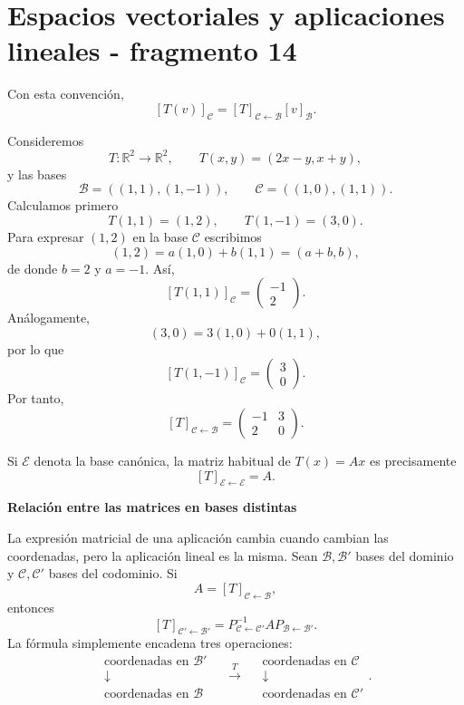 \section{Espacios vectoriales y aplicaciones lineales - fragmento 14}
Con esta convención,
\[
\boxed{
[T(v)]_{\mathcal C}
=
[T]_{\mathcal C\leftarrow\mathcal B}
[v]_{\mathcal B}.
}
\]

\begin{example}
Consideremos
\[
T:\mathbb{R}^2\longrightarrow\mathbb{R}^2,
\qquad
T(x,y)=(2x-y,x+y),
\]
y las bases
\[
\mathcal B=((1,1),(1,-1)),
\qquad
\mathcal C=((1,0),(1,1)).
\]
Calculamos primero
\[
T(1,1)=(1,2),
\qquad
T(1,-1)=(3,0).
\]
Para expresar $(1,2)$ en la base $\mathcal C$ escribimos
\[
(1,2)=a(1,0)+b(1,1)=(a+b,b),
\]
de donde $b=2$ y $a=-1$. Así,
\[
[T(1,1)]_{\mathcal C}
=\begin{pmatrix}-1\\2\end{pmatrix}.
\]
Análogamente,
\[
(3,0)=3(1,0)+0(1,1),
\]
por lo que
\[
[T(1,-1)]_{\mathcal C}
=\begin{pmatrix}3\\0\end{pmatrix}.
\]
Por tanto,
\[
\boxed{
[T]_{\mathcal C\leftarrow\mathcal B}
=
\begin{pmatrix}
-1&3\\
2&0
\end{pmatrix}.
}
\]
\end{example}

Si $\mathcal E$ denota la base canónica, la matriz habitual de $T(x)=Ax$ es precisamente
\[
[T]_{\mathcal E\leftarrow\mathcal E}=A.
\]

\textbf{Relación entre las matrices en bases distintas}

La expresión matricial de una aplicación cambia cuando cambian las coordenadas, pero la aplicación lineal es la misma. Sean $\mathcal B,\mathcal B'$ bases del dominio y $\mathcal C,\mathcal C'$ bases del codominio. Si
\[
A=[T]_{\mathcal C\leftarrow\mathcal B},
\]
entonces
\[
\boxed{
[T]_{\mathcal C'\leftarrow\mathcal B'}
=
P_{\mathcal C\leftarrow\mathcal C'}^{-1}
A
P_{\mathcal B\leftarrow\mathcal B'}.
}
\]
La fórmula simplemente encadena tres operaciones:
\[
\begin{array}{c}
\text{coordenadas en }\mathcal B'\\[-1mm]
\downarrow\\[-1mm]
\text{coordenadas en }\mathcal B
\end{array}
\quad\xrightarrow{\ T\ }\quad
\begin{array}{c}
\text{coordenadas en }\mathcal C\\[-1mm]
\downarrow\\[-1mm]
\text{coordenadas en }\mathcal C'
\end{array}.
\]


